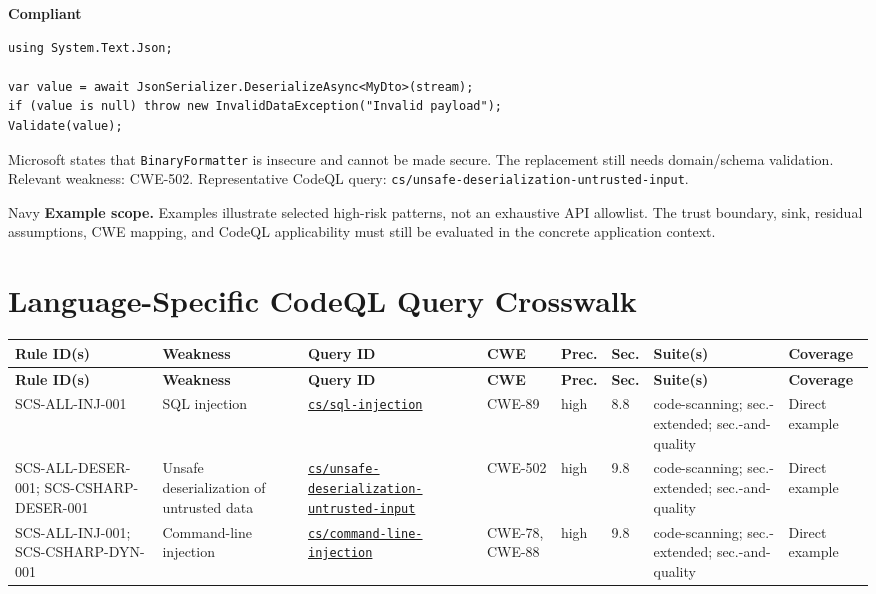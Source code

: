 \documentclass[10pt,letterpaper]{article}
\newcommand{\code}[1]{\texttt{\small #1}}
\begin{document}
\textbf{Compliant}\par
\begin{lstlisting}[language={[Sharp]C}]
using System.Text.Json;

var value = await JsonSerializer.DeserializeAsync<MyDto>(stream);
if (value is null) throw new InvalidDataException("Invalid payload");
Validate(value);
\end{lstlisting}

Microsoft states that \code{BinaryFormatter} is insecure and cannot be made secure. The replacement still needs domain/schema validation. Relevant weakness: CWE-502. Representative CodeQL query: \code{cs/unsafe-deserialization-untrusted-input}.\par
\begin{callout}{Navy}
\textbf{Example scope.} Examples illustrate selected high-risk patterns, not an exhaustive API allowlist. The trust boundary, sink, residual assumptions, CWE mapping, and CodeQL applicability must still be evaluated in the concrete application context.
\end{callout}
\section{Language-Specific CodeQL Query Crosswalk}\begin{landscape}\scriptsize
\setlength{\tabcolsep}{2.6pt}
\begin{longtable}{@{}P{1.28in}P{1.12in}P{1.52in}P{0.78in}P{0.52in}P{0.48in}P{1.32in}P{0.82in}@{}}
\toprule
\textbf{Rule ID(s)} & \textbf{Weakness} & \textbf{Query ID} & \textbf{CWE} & \textbf{Prec.} & \textbf{Sec.} & \textbf{Suite(s)} & \textbf{Coverage}\\
\midrule
\endfirsthead
\toprule
\textbf{Rule ID(s)} & \textbf{Weakness} & \textbf{Query ID} & \textbf{CWE} & \textbf{Prec.} & \textbf{Sec.} & \textbf{Suite(s)} & \textbf{Coverage}\\
\midrule
\endhead
SCS-ALL-INJ-001 & SQL injection & \href{https://codeql.github.com/codeql-query-help/csharp/cs-sql-injection/}{\code{cs/sql-injection}} & CWE-89 & high & 8.8 & code-scanning; sec.-extended; sec.-and-quality & Direct example\\
SCS-ALL-DESER-001; SCS-CSHARP-DESER-001 & Unsafe deserialization of untrusted data & \href{https://codeql.github.com/codeql-query-help/csharp/cs-unsafe-deserialization-untrusted-input/}{\code{cs/unsafe-deserialization-untrusted-input}} & CWE-502 & high & 9.8 & code-scanning; sec.-extended; sec.-and-quality & Direct example\\
SCS-ALL-INJ-001; SCS-CSHARP-DYN-001 & Command-line injection & \href{https://codeql.github.com/codeql-query-help/csharp/cs-command-line-injection/}{\code{cs/command-line-injection}} & CWE-78, CWE-88 & high & 9.8 & code-scanning; sec.-extended; sec.-and-quality & Direct example\\
\bottomrule
\end{longtable}
\normalsize\end{landscape}
\end{document}
